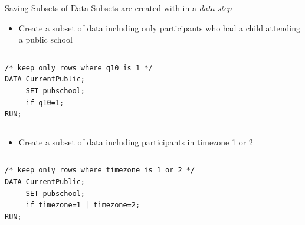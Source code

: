 \documentclass[table,smaller]{beamer}
\begin{document}
\begin{frame}[fragile,label=sec-5-3]{Saving Subsets of Data}
 Subsets are created with in a \emph{data step}

\begin{itemize}
\item Create a subset of data including only participants who had a child attending a public school
\end{itemize}

\vspace{-.75em} \begin{columns}  \begin{block}{}
\begin{verbatim}
/* keep only rows where q10 is 1 */
DATA CurrentPublic;
     SET pubschool;
     if q10=1;
RUN;
\end{verbatim}
\end{block} \end{columns} \vspace{.25em}

\begin{itemize}
\item Create a subset of data including participants in timezone 1 or 2
\end{itemize}
\vspace{-.75em} \begin{columns}  \begin{block}{}
\begin{verbatim}
/* keep only rows where timezone is 1 or 2 */
DATA CurrentPublic;
     SET pubschool;
     if timezone=1 | timezone=2;
RUN;
\end{verbatim}
\end{block} \end{columns} \vspace{.25em}
\end{frame}
\end{document}
